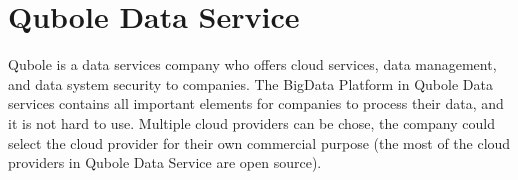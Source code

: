 \section{Qubole Data Service}

Qubole is a data services company who offers cloud services, data management, and data system security to companies. The BigData Platform in Qubole Data services contains all important elements for companies to process their data, and it is not hard to use. Multiple cloud providers can be chose, the company could select the cloud provider for their own commercial purpose (the most of the cloud providers in Qubole Data Service are open source)\cite{QDS}.
